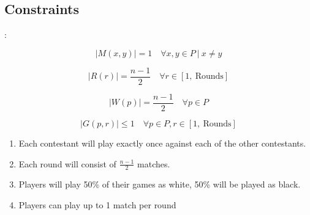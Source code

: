 \documentclass[9pt, aspectratio=169, xcolor=table]{beamer}
\begin{document}
\subsection{Constraints}
\begin{frame}{\secname: \subsecname}
    \begin{minipage}{0.49\textwidth}
	\begin{equation}
	    \label{playwitheachother}
	    |M(x,y)| = 1 \quad \forall x,y \in P \ | \  x \neq y
	\end{equation}

	\begin{equation}
	    \label{matchesperround}
	    |R(r)| = \frac{n-1}{2}  \quad \forall r \in [1,\ \text{Rounds}] 
	\end{equation}

	\begin{equation}
	    \label{fairness}
	    |W(p)| = \frac{n-1}{2} \quad \forall p \in P
	\end{equation}

	\begin{equation}
	    \label{1gameperround}
	    |G(p,r)| \leq 1 \quad \forall p \in P, r \in [1, \ \text{Rounds}] 
	\end{equation}


    \end{minipage}
    \hfill
    \begin{minipage}{0.49\textwidth}
	\begin{enumerate}
	    \item Each contestant will play exactly once against each of the other contestants.
	    \item Each round will consist of $\frac{n-1}{2}$ matches.
	    \item Players will play 50\% of their games as white, 50\% will be played as black.
	    \item Players can play up to 1 match per round
	\end{enumerate}
    \end{minipage}

\end{frame}
\end{document}
